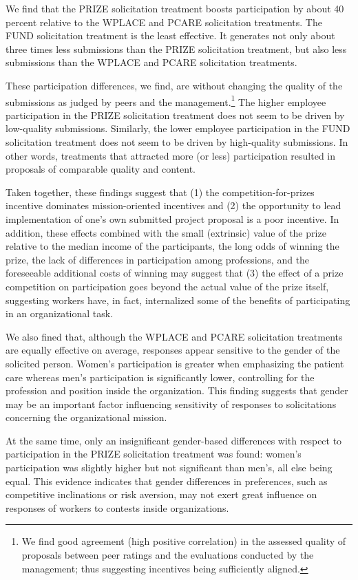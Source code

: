 \documentclass[11pt, titlepage]{article}
\begin{document}
We find that the PRIZE solicitation treatment boosts participation by
about 40 percent relative to the WPLACE and PCARE solicitation
treatments. The FUND solicitation treatment is the least effective. It
generates not only about three times less submissions than the PRIZE
solicitation treatment, but also less submissions than the WPLACE and
PCARE solicitation treatments.

These participation differences, we find, are without changing the
quality of the submissions as judged by peers and the
management.\footnote{We find good agreement (high positive correlation)
  in the assessed quality of proposals between peer ratings and the
  evaluations conducted by the management; thus suggesting incentives
  being sufficiently aligned.} The higher employee participation in the
PRIZE solicitation treatment does not seem to be driven by low-quality
submissions. Similarly, the lower employee participation in the FUND
solicitation treatment does not seem to be driven by high-quality
submissions. In other words, treatments that attracted more (or less)
participation resulted in proposals of comparable quality and content.

Taken together, these findings suggest that (1) the
competition-for-prizes incentive dominates mission-oriented incentives
and (2) the opportunity to lead implementation of one's own submitted
project proposal is a poor incentive. In addition, these effects
combined with the small (extrinsic) value of the prize relative to the
median income of the participants, the long odds of winning the prize,
the lack of differences in participation among professions, and the
foreseeable additional costs of winning may suggest that (3) the effect
of a prize competition on participation goes beyond the actual value of
the prize itself, suggesting workers have, in fact, internalized some of
the benefits of participating in an organizational task.

We also fined that, although the WPLACE and PCARE solicitation
treatments are equally effective on average, responses appear sensitive
to the gender of the solicited person. Women's participation is greater
when emphasizing the patient care whereas men's participation is
significantly lower, controlling for the profession and position inside
the organization. This finding suggests that gender may be an important
factor influencing sensitivity of responses to solicitations concerning
the organizational mission.

At the same time, only an insignificant gender-based differences with
respect to participation in the PRIZE solicitation treatment was found:
women's participation was slightly higher but not significant than
men's, all else being equal. This evidence indicates that gender
differences in preferences, such as competitive inclinations or risk
aversion, may not exert great influence on responses of workers to
contests inside organizations.
\end{document}
